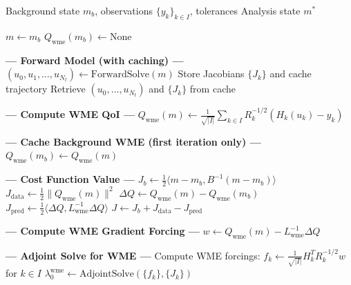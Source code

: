 \documentclass[11pt]{article}
\newcommand{\mb}{m_b}
\newcommand{\Binv}{B^{-1}}
\newcommand{\Rsqrtinv}{R^{-1/2}}
\newcommand{\Lwme}{L_{\text{wme}}}
\newcommand{\Qwme}{Q_{\text{wme}}}
\begin{document}
\begin{algorithm}[H]
\caption{DC-WME 4D-Var}
\label{alg:dcwme}
\begin{algorithmic}[1]
\Require Background state $\mb$, observations $\{y_k\}_{k \in I}$, tolerances
\Ensure Analysis state $m^*$

\State $m \gets \mb$ 
\State $\Qwme(\mb) \gets \text{None}$ 


    \State \textbf{--- Forward Model (with caching) ---}
        \State $(u_0, u_1, \ldots, u_{N_t}) \gets \text{ForwardSolve}(m)$ \Comment{\textcolor{blue}{Cost: 1 forward solve}}
        \State Store Jacobians $\{J_k\}$ and cache trajectory
    \Else
        \State Retrieve $(u_0, \ldots, u_{N_t})$ and $\{J_k\}$ from cache 
    \EndIf

    \State \textbf{--- Compute WME QoI ---} 
    \State $\Qwme(m) \gets \frac{1}{\sqrt{|I|}} \sum_{k \in I} \Rsqrtinv_k (H_k(u_k) - y_k)$

    \State \textbf{--- Cache Background WME (first iteration only) ---}
    \If{$\Qwme(\mb) = \text{None}$} \Comment{\textcolor{red}{First iteration: $m = \mb$}}
        \State $\Qwme(\mb) \gets \Qwme(m)$ 
    \EndIf

    \State \textbf{--- Cost Function Value ---} 
    \State $J_b \gets \frac{1}{2}\langle m - \mb, \Binv(m - \mb)\rangle$
    \State $J_{\text{data}} \gets \frac{1}{2}\|\Qwme(m)\|^2$
    \State $\Delta Q \gets \Qwme(m) - \Qwme(\mb)$
    \State $J_{\text{pred}} \gets \frac{1}{2}\langle \Delta Q, \Lwme^{-1} \Delta Q\rangle$ 
    \State $J \gets J_b + J_{\text{data}} - J_{\text{pred}}$

    \State \textbf{--- Compute WME Gradient Forcing ---} 
    \State $w \gets \Qwme(m) - \Lwme^{-1}\Delta Q$ 

    \State \textbf{--- Adjoint Solve for WME ---} 
    \State Compute WME forcings: $f_k \gets \frac{1}{\sqrt{|I|}} H_k^T \Rsqrtinv_k w$ for $k \in I$
    \State $\lambda_0^{\text{wme}} \gets \text{AdjointSolve}(\{f_k\}, \{J_k\})$


\end{algorithmic}
\end{algorithm}
\end{document}
